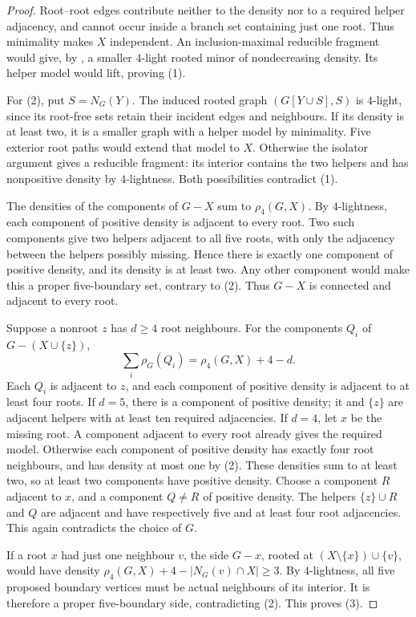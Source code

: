 \begin{proof}
Root--root edges contribute neither to the density nor to a required
helper adjacency, and cannot occur inside a branch set containing just
one root. Thus minimality makes $X$ independent. An inclusion-maximal
reducible fragment would give, by \cite[Lemma~3.3]{DNR2026}, a smaller
$4$-light rooted
minor of nondecreasing density. Its helper model would lift, proving
(1).

For (2), put $S=N_G(Y)$. The induced rooted graph $(G[Y\cup S],S)$
is $4$-light, since its root-free sets retain their incident edges and
neighbours. If its density is at least two, it is a smaller graph with
a helper model by minimality. Five exterior root paths would extend
that model to $X$. Otherwise the isolator argument gives a reducible
fragment: its interior contains the two helpers and has nonpositive
density by $4$-lightness. Both possibilities contradict (1).

The densities of the components of $G-X$ sum to $\rho_4(G,X)$. By
$4$-lightness, each component of positive density is adjacent to every
root. Two such components give two helpers adjacent to all five
roots, with only the adjacency between the helpers possibly missing.
Hence there is exactly one component of positive density, and its
density is at least two. Any other component would make this a proper
five-boundary set, contrary to (2). Thus $G-X$ is connected and adjacent
to every root.

Suppose a nonroot $z$ has $d\ge4$ root neighbours. For the components
$Q_i$ of $G-(X\cup\{z\})$,
\[
 \sum_i\rho_G(Q_i)=\rho_4(G,X)+4-d.
\]
Each $Q_i$ is adjacent to $z$, and each component of positive density
is adjacent to at least four roots. If $d=5$, there is a component
of positive density; it and $\{z\}$ are adjacent helpers with at least
ten required adjacencies. If $d=4$, let $x$ be the missing root. A
component adjacent to every root already gives the required model.
Otherwise each component of positive density has exactly four root
neighbours, and has density at most one by (2). These densities sum to
at least two, so at least two components have positive density. Choose
a component $R$ adjacent to $x$, and a component $Q\ne R$ of
positive density. The helpers $\{z\}\cup R$ and $Q$ are adjacent and
have respectively five and at least four root adjacencies. This again
contradicts the choice of $G$.

If a root $x$ had just one neighbour $v$, the side $G-x$, rooted at
$(X\setminus\{x\})\cup\{v\}$, would have density
$\rho_4(G,X)+4-|N_G(v)\cap X|\ge3$. By $4$-lightness, all five
proposed boundary vertices must be actual neighbours of its interior.
It is therefore a proper five-boundary side, contradicting (2). This
proves (3).


\end{proof}
